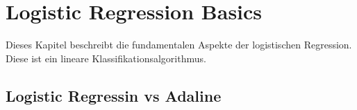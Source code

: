 \newpage
\section{Logistic Regression Basics}
\label{sec:logistic_regression_basics}

Dieses Kapitel beschreibt die fundamentalen Aspekte der logistischen Regression. Diese ist ein lineare Klassifikationsalgorithmus.



\subsection{Logistic Regressin vs Adaline}



